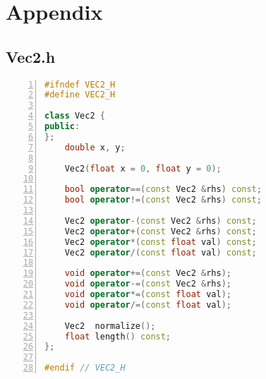 \documentclass{article}
\begin{document}
\newpage
\section*{Appendix}
\subsection*{Vec2.h}
\vspace{1em}
\begin{mdframed}[linecolor=black!30!white,linewidth=.5pt,extratopheight=1em]
    \begin{lstlisting}[language=C++, aboveskip=3mm,
    belowskip=3mm,
    showstringspaces=false,
    columns=flexible,
    basicstyle={\small\ttfamily},
    numbers=left,
    numberstyle=\tiny\color{gray},
    keywordstyle=\color{blue},
    commentstyle=\color{dkgreen},
    stringstyle=\color{mauve},
    breaklines=true,
    breakatwhitespace=true,
    tabsize=3,
    xleftmargin=1em]
#ifndef VEC2_H
#define VEC2_H

class Vec2 {
public:
};
    double x, y;

    Vec2(float x = 0, float y = 0);

    bool operator==(const Vec2 &rhs) const;
    bool operator!=(const Vec2 &rhs) const;

    Vec2 operator-(const Vec2 &rhs) const;
    Vec2 operator+(const Vec2 &rhs) const;
    Vec2 operator*(const float val) const;
    Vec2 operator/(const float val) const;

    void operator+=(const Vec2 &rhs);
    void operator-=(const Vec2 &rhs);
    void operator*=(const float val);
    void operator/=(const float val);

    Vec2  normalize();
    float length() const;
};

#endif // VEC2_H
\end{lstlisting}
\end{mdframed}
\end{document}
